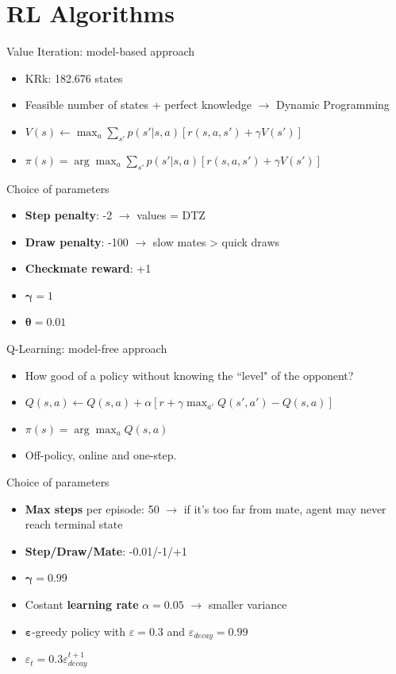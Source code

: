 \section{RL Algorithms}

\begin{frame}{Value Iteration: model-based approach}
  \begin{itemize}
  \item KRk: 182.676 states
  \item Feasible number of states + perfect knowledge $\rightarrow$ Dynamic Programming
  \item $V(s) \leftarrow \max_a \sum_{s'}p(s'|s,a)[r(s,a,s')+\gamma V(s')]$
  \item $\pi(s) = \arg\max_a \sum_{s'}p(s'|s,a)[r(s,a,s')+\gamma V(s')]$
  \end{itemize}
\end{frame}

\begin{frame}{Choice of parameters}
  \begin{itemize}
    \item \textbf{Step penalty}: -2 $\rightarrow$ values = DTZ
    \item \textbf{Draw penalty}: -100 $\rightarrow$ slow mates > quick draws
    \item \textbf{Checkmate reward}: +1
    \item $\mathbf{\gamma} = 1$
    \item $\mathbf{\theta} = 0.01$
  \end{itemize}
\end{frame}

\begin{frame}{Q-Learning: model-free approach}
  \begin{itemize}
    \item How good of a policy without knowing the ``level" of the opponent?
    \item $Q(s,a) \leftarrow Q(s,a) + \alpha[r + \gamma \max_{a'}Q(s',a') - Q(s,a)]$
    \item $\pi(s) = \arg\max_a Q(s,a)$
    \item Off-policy, online and one-step.
  \end{itemize}
\end{frame}

\begin{frame}{Choice of parameters}
  \begin{itemize}
    \item \textbf{Max steps} per episode: 50 $\rightarrow$ if it's too far from mate, agent may never reach terminal state
    \item \textbf{Step/Draw/Mate}: -0.01/-1/+1
    \item $\mathbf{\gamma} = 0.99$
    \item Costant \textbf{learning rate} $\alpha = 0.05$ $\rightarrow$ smaller variance
    \item $\mathbf{\varepsilon}$-greedy policy with $\varepsilon = 0.3$ and  $\varepsilon_{\textit{decay}}=0.99$
    \item $\varepsilon_t = 0.3\varepsilon_{\textit{decay}}^{t+1}$
  \end{itemize}
\end{frame}

